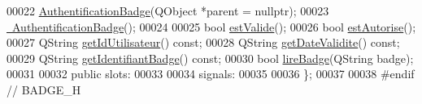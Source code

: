 \begin{DoxyCode}
00022     \hyperlink{class_authentification_badge_a6c27fe0dc2a4a20fec1e75da5b400146}{AuthentificationBadge}(QObject *parent = \textcolor{keyword}{nullptr});
00023     \hyperlink{class_authentification_badge_a636b585e4c7f37ae77bf2fd66c0b01e1}{~AuthentificationBadge}();
00024 
00025     \textcolor{keywordtype}{bool} \hyperlink{class_authentification_badge_af320bf9cdbb285c48cd323e0ec3ef529}{estValide}();
00026     \textcolor{keywordtype}{bool} \hyperlink{class_authentification_badge_aceb9c5a09dddbff73cd02973913c79c1}{estAutorise}();
00027     QString \hyperlink{class_authentification_badge_ae8c755b184c20626d4362d5e4739dfe1}{getIdUtilisateur}() \textcolor{keyword}{const};
00028     QString \hyperlink{class_authentification_badge_a76f7b9a424aeec947813c6858ff945a3}{getDateValidite}() \textcolor{keyword}{const};
00029     QString \hyperlink{class_authentification_badge_a4bb0edf5a4483d9125bc53b1a7e24b7b}{getIdentifiantBadge}() \textcolor{keyword}{const};
00030     \textcolor{keywordtype}{bool} \hyperlink{class_authentification_badge_a77488a375465873bfe6ab62f53abea6d}{lireBadge}(QString badge);
00031 
00032 \textcolor{keyword}{public} slots:    
00033 
00034 signals:
00035 
00036 \};
00037 
00038 \textcolor{preprocessor}{#endif // BADGE\_H}
\end{DoxyCode}
